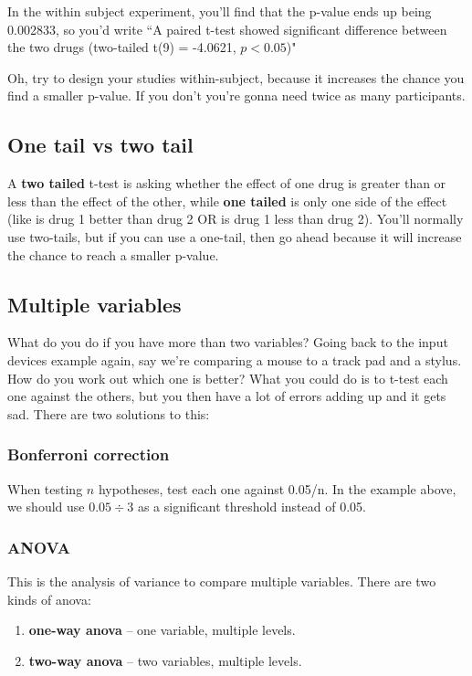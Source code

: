 \documentclass[11pt,a4paper,titlepage]{scrartcl}
\begin{document}
In the within subject experiment, you'll find that the p-value ends up
being 0.002833, so you'd write ``A paired t-test showed significant
difference between the two drugs (two-tailed t(9) = -4.0621, $p<0.05$)"

Oh, try to design your studies within-subject, because it increases the
chance you find a smaller p-value. If you don't you're gonna need twice as
many participants.

\subsection{One tail vs two tail}%
\label{sub:tail}
A \textbf{two tailed} t-test is asking whether the effect of one drug is
greater than or less than the effect of the other, while \textbf{one
tailed} is only one side of the effect (like is drug 1 better than drug 2
OR is drug 1 less than drug 2). You'll normally use two-tails, but if you
can use a one-tail, then go ahead because it will increase the chance to
reach a smaller p-value.

\subsection{Multiple variables}%
\label{sub:multiple}
What do you do if you have more than two variables? Going back to the
input devices example again, say we're comparing a mouse to a track pad and
a stylus. How do you work out which one is better? What you could do is to
t-test each one against the others, but you then have a lot of errors
adding up and it gets sad. There are two solutions to this:

\subsubsection{Bonferroni correction}%
\label{ssub:bonferroni}
When testing $n$ hypotheses, test each one against 0.05/n. In the example
above, we should use $0.05 \div 3$ as a significant threshold instead of
0.05.

\subsubsection{ANOVA}%
\label{ssub:anova}
This is the analysis of variance to compare multiple variables. There are
two kinds of anova:
\begin{enumerate}
    \item \textbf{one-way anova} -- one variable, multiple levels.
    \item \textbf{two-way anova} -- two variables, multiple levels.
\end{enumerate}
\end{document}
